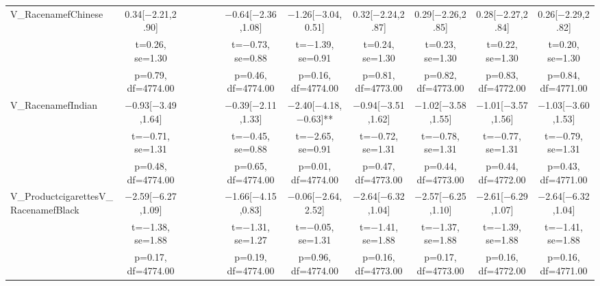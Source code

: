 \documentclass[]{report}
\begin{document}
\begin{table}
{\begin{tabular}[t]{lccccccccccc}
		V\_RacenamefChinese & \num{0.34}[\num{-2.21},\num{2.90}] &  &  &  &  & \num{-0.64}[\num{-2.36},\num{1.08}] & \num{-1.26}[\num{-3.04},\num{0.51}] & \num{0.32}[\num{-2.24},\num{2.87}] & \num{0.29}[\num{-2.26},\num{2.85}] & \num{0.28}[\num{-2.27},\num{2.84}] & \num{0.26}[\num{-2.29},\num{2.82}]\\
		& t=\num{0.26}, se=\num{1.30} &  &  &  &  & t=\num{-0.73}, se=\num{0.88} & t=\num{-1.39}, se=\num{0.91} & t=\num{0.24}, se=\num{1.30} & t=\num{0.23}, se=\num{1.30} & t=\num{0.22}, se=\num{1.30} & t=\num{0.20}, se=\num{1.30}\\
		& p=\num{0.79}, df=\num{4774.00} &  &  &  &  & p=\num{0.46}, df=\num{4774.00} & p=\num{0.16}, df=\num{4774.00} & p=\num{0.81}, df=\num{4773.00} & p=\num{0.82}, df=\num{4773.00} & p=\num{0.83}, df=\num{4772.00} & p=\num{0.84}, df=\num{4771.00}\\
		V\_RacenamefIndian & \num{-0.93}[\num{-3.49},\num{1.64}] &  &  &  &  & \num{-0.39}[\num{-2.11},\num{1.33}] & \num{-2.40}[\num{-4.18},\num{-0.63}]** & \num{-0.94}[\num{-3.51},\num{1.62}] & \num{-1.02}[\num{-3.58},\num{1.55}] & \num{-1.01}[\num{-3.57},\num{1.56}] & \num{-1.03}[\num{-3.60},\num{1.53}]\\
		& t=\num{-0.71}, se=\num{1.31} &  &  &  &  & t=\num{-0.45}, se=\num{0.88} & t=\num{-2.65}, se=\num{0.91} & t=\num{-0.72}, se=\num{1.31} & t=\num{-0.78}, se=\num{1.31} & t=\num{-0.77}, se=\num{1.31} & t=\num{-0.79}, se=\num{1.31}\\
		& p=\num{0.48}, df=\num{4774.00} &  &  &  &  & p=\num{0.65}, df=\num{4774.00} & p=\num{0.01}, df=\num{4774.00} & p=\num{0.47}, df=\num{4773.00} & p=\num{0.44}, df=\num{4773.00} & p=\num{0.44}, df=\num{4772.00} & p=\num{0.43}, df=\num{4771.00}\\
		V\_ProductcigarettesV\_RacenamefBlack & \num{-2.59}[\num{-6.27},\num{1.09}] &  &  &  &  & \num{-1.66}[\num{-4.15},\num{0.83}] & \num{-0.06}[\num{-2.64},\num{2.52}] & \num{-2.64}[\num{-6.32},\num{1.04}] & \num{-2.57}[\num{-6.25},\num{1.10}] & \num{-2.61}[\num{-6.29},\num{1.07}] & \num{-2.64}[\num{-6.32},\num{1.04}]\\
		& t=\num{-1.38}, se=\num{1.88} &  &  &  &  & t=\num{-1.31}, se=\num{1.27} & t=\num{-0.05}, se=\num{1.31} & t=\num{-1.41}, se=\num{1.88} & t=\num{-1.37}, se=\num{1.88} & t=\num{-1.39}, se=\num{1.88} & t=\num{-1.41}, se=\num{1.88}\\
		& p=\num{0.17}, df=\num{4774.00} &  &  &  &  & p=\num{0.19}, df=\num{4774.00} & p=\num{0.96}, df=\num{4774.00} & p=\num{0.16}, df=\num{4773.00} & p=\num{0.17}, df=\num{4773.00} & p=\num{0.16}, df=\num{4772.00} & p=\num{0.16}, df=\num{4771.00}\\

\end{tabular}}
\end{table}
\end{document}
